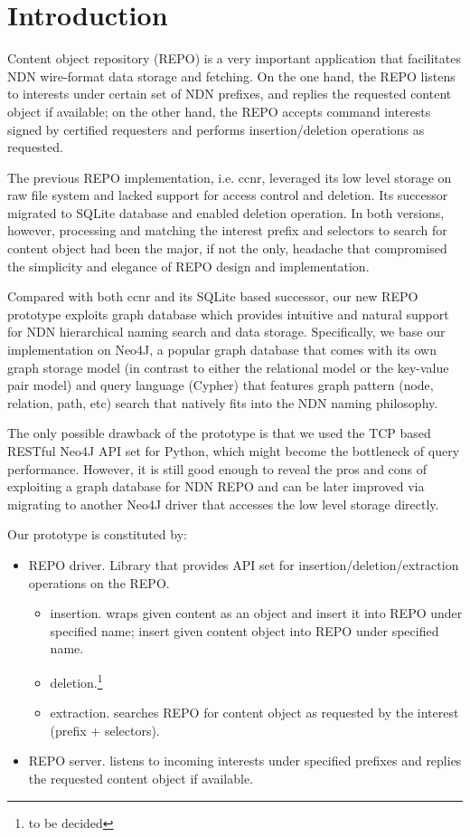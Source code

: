 \section{Introduction}

Content object repository (REPO) is a very important application that facilitates NDN wire-format data storage and fetching. On the one hand, the REPO listens to interests under certain set of NDN prefixes, and replies the requested content object if available; on the other hand, the REPO accepts command interests signed by certified requesters and performs insertion/deletion operations as requested.

The previous REPO implementation, i.e. ccnr, leveraged its low level storage on raw file system and lacked support for access control and deletion. Its successor migrated to SQLite database and enabled deletion operation. In both versions, however, processing and matching the interest prefix and selectors to search for content object had been the major, if not the only, headache that compromised the simplicity and elegance of REPO design and implementation.

Compared with both ccnr and its SQLite based successor, our new REPO prototype exploits graph database which provides intuitive and natural support for NDN hierarchical naming search and data storage. Specifically, we base our implementation on Neo4J, a popular graph database that comes with its own graph storage model (in contrast to either the relational model or the key-value pair model) and query language (Cypher) that features graph pattern (node, relation, path, etc) search that natively fits into the NDN naming philosophy.

The only possible drawback of the prototype is that we used the TCP based RESTful Neo4J API set for Python, which might become the bottleneck of query performance. However, it is still good enough to reveal the pros and cons of exploiting a graph database for NDN REPO and can be later improved via migrating to another Neo4J driver that accesses the low level storage directly.

Our prototype is constituted by:
\begin{itemize}
    \item REPO driver. Library that provides API set for insertion/deletion/extraction operations on the REPO.
    \begin{itemize}
        \item insertion. wraps given content as an object and insert it into REPO under specified name; insert given content object into REPO under specified name.
        \item deletion.\footnote{to be decided}
        \item extraction. searches REPO for content object as requested by the interest (prefix + selectors).
    \end{itemize}
    \item REPO server. listens to incoming interests under specified prefixes and replies the requested content object if available.
\end{itemize}

